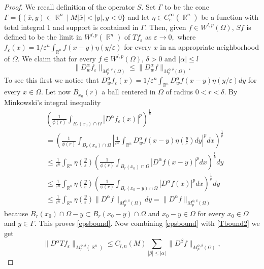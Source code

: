 \documentclass[12pt]{article}
\theoremstyle{definition}
\DeclareMathOperator\rr{\mathbb{R}}
\begin{document}
 \begin{proof}
We recall definition of the operator $S.$ Set  $\Gamma$ to be the cone $\Gamma=\{(\overline x, y) \in \rr^n \ | \ M |\overline x|<|y|, y<0 \}$ and let $\eta \in C^\infty_c(\rr^n)$ be a function with total integral 1 and support is contained in $\Gamma.$ Then, given $f \in W^{l,p}(\Omega)$, $Sf$ is defined to be the limit in $W^{l,p}(\rr^n)$ of $Tf_\varepsilon$ as $\varepsilon \to 0,$ where $f_\varepsilon(x)=1/\varepsilon^n \int_{\rr^n} f(x-y)\eta(y/\varepsilon)$ for every $x$ in an appropriate neighborhood of $	\overline \Omega$. We claim that for every $f \in W^{l,p}(\Omega)$, $\delta>0$ and $|\alpha|\le l$
\begin{equation}
\| D^\alpha_w f_\varepsilon\|_{M^{\phi,\delta}_p(\Omega)} \le \| D^\alpha_w f\|_{M^{\phi,\delta}_p(\Omega)} \label{epsbound}.
\end{equation}
To see this first we notice that $D^\alpha_w f_\varepsilon(x)=1/\varepsilon^n \int_{\rr^n} D^\alpha_w f(x-y)\eta(y/\varepsilon)dy$ for every $x \in \Omega.$ Let now $B_{x_0}(r)$ a ball centered in $\Omega$ of radius $0<r<\delta$. By Minkowski's integral inequality
\begin{align*}
& \left( \frac{1}{	\phi(r)} \int_{B_r(x_0)\cap \Omega} |D^\alpha f_\varepsilon (x)|^p \right)^{\frac{1}{p}} \\
&= \left( \frac{1}{	\phi(r)} \int_{B_r(x_0)\cap \Omega} \left |\frac{1}{\varepsilon^n} \int_{\rr^n} D^\alpha_w f(x-y)\eta\left(\frac{y}{\varepsilon} \right)dy\right|^pdx \right)^{\frac{1}{p}} \\
 &\le \frac{1}{\varepsilon^n}  \int_{\rr^n} \eta\left(\frac{y}{\varepsilon} \right) \left (\frac{1}{	\phi(r)}  \int_{B_r(x_0)\cap \Omega} |D^\alpha f(x-y)|^p dx\right)^{\frac{1}{p}}dy \\
 &\le\frac{1}{\varepsilon^n}  \int_{\rr^n} \eta\left(\frac{y}{\varepsilon} \right)  \left (\frac{1}{	\phi(r)}  \int_{B_r(x_0-y)\cap \Omega} |D^\alpha f(x)|^p dx\right)^{\frac{1}{p}}dy \\
 & \le \frac{1}{\varepsilon^n}  \int_{\rr^n} \eta\left(\frac{y}{\varepsilon} \right) \| D^\alpha f\|_{M_p^{\phi,\delta}(\Omega)} dy=\| D^\alpha f\|_{M_p^{\phi,\delta}(\Omega)}
\end{align*}
because $B_r(x_0)\cap \Omega -y \subset B_r(x_0-y)\cap \Omega$ and $x_0-y \in \Omega$ for every $x_0 \in \Omega$ and $y \in \Gamma.$ This proves \eqref{epsbound}. Now combining \eqref{epsbound} with \eqref{Tbound2} we get 
\[ \| D^\alpha Tf_\varepsilon\|_{M_p^{\phi,\delta}(\rr^n)}\le C_{l,n}(M)\sum_{|\beta|\le |\alpha|}\|D^\beta f \|_{M_p^{\phi,\delta}(\Omega)}, \]

\end{proof}
\end{document}
